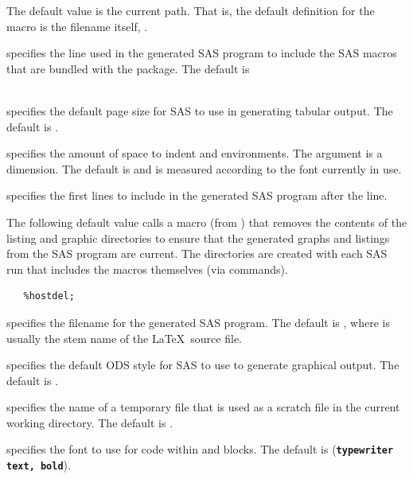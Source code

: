\documentclass[article,oneside]{memoir}
\begin{document}
\begin{description}
   The default value is the current path. That is, the default
   definition for the  macro is the filename itself, .

     \item[\cs{SRmacroinclude}] specifies the line used in the generated SAS program to
     include the SAS macros that are bundled with the  package.
     The default is\\~

    \item[\cs{SRpagesize}] specifies the default page size for SAS to use in generating
    tabular output. The default is .


     \item[\cs{SRparindent}] specifies the amount of space to indent
      and  environments.
     The argument is a dimension.
     The default is \Code{3em} and is measured according to the font currently in use.

     \item[\cs{SRprogramline}] specifies the first lines to include in the generated SAS program
     after the  line.

     The following default value calls a macro (from )
     that removes the contents of the listing and graphic directories to ensure
     that the generated graphs and listings from the SAS program are current.
     The directories are created with
     each SAS run that includes the macros themselves (via  commands).
\begin{snugshade}
\begin{verbatim}
   %hostdel;
\end{verbatim}
\end{snugshade}

      \item[\cs{SRprogramname}] specifies the filename for the generated SAS
     program. The default is , where  is
     usually the stem name of the \LaTeX\ source file.


    \item[\cs{SRstyle}] specifies the default ODS style for SAS to use to generate
    graphical output. The default is .

     \item[\cs{SRtempfilename}] specifies the name of a temporary file
     that is used as a scratch file in the current working directory.
     The default is .

     \item[\cs{SRverbfont}] specifies the font to use for code within  and
      blocks. The default is 
     (\texttt{\textbf{typewriter text, bold}}).

     \end{description}
\end{document}

